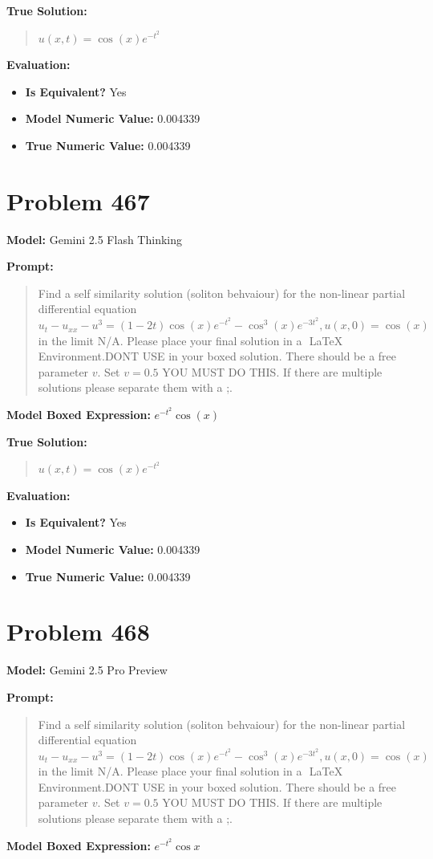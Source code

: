 \documentclass{article}
\begin{document}
\textbf{True Solution:}
\begin{quote}
$u(x,t) = \cos(x) e^{-t^2}$
\end{quote}

\textbf{Evaluation:}
\begin{itemize}
\item \textbf{Is Equivalent?} Yes
\item \textbf{Model Numeric Value:} 0.004339
\item \textbf{True Numeric Value:} 0.004339
\end{itemize}
\vspace{1cm}
\section*{Problem 467}
\textbf{Model:} Gemini 2.5 Flash Thinking

\textbf{Prompt:}
\begin{quote}
Find a self similarity solution (soliton behvaiour) for the non-linear partial differential equation $u_t - u_{xx} - u^3 = (1-2t)\cos(x)e^{-t^2} - \cos^3(x)e^{-3t^2}, u(x,0) = \cos(x)$ in the limit N/A. Please place your final solution in a $\boxed{}$ LaTeX Environment.DONT USE \operatorname in your boxed solution. There should be a free parameter $v$. Set $v=0.5$ YOU MUST DO THIS. If there are multiple solutions please separate them with a ;.
\end{quote}
\textbf{Model Boxed Expression:} $e^{-t^2}\cos(x)$

\textbf{True Solution:}
\begin{quote}
$u(x,t) = \cos(x) e^{-t^2}$
\end{quote}

\textbf{Evaluation:}
\begin{itemize}
\item \textbf{Is Equivalent?} Yes
\item \textbf{Model Numeric Value:} 0.004339
\item \textbf{True Numeric Value:} 0.004339
\end{itemize}
\vspace{1cm}
\section*{Problem 468}
\textbf{Model:} Gemini 2.5 Pro Preview

\textbf{Prompt:}
\begin{quote}
Find a self similarity solution (soliton behvaiour) for the non-linear partial differential equation $u_t - u_{xx} - u^3 = (1-2t)\cos(x)e^{-t^2} - \cos^3(x)e^{-3t^2}, u(x,0) = \cos(x)$ in the limit N/A. Please place your final solution in a $\boxed{}$ LaTeX Environment.DONT USE \operatorname in your boxed solution. There should be a free parameter $v$. Set $v=0.5$ YOU MUST DO THIS. If there are multiple solutions please separate them with a ;.
\end{quote}
\textbf{Model Boxed Expression:} $e^{-t^2} \cos x$
\end{document}
